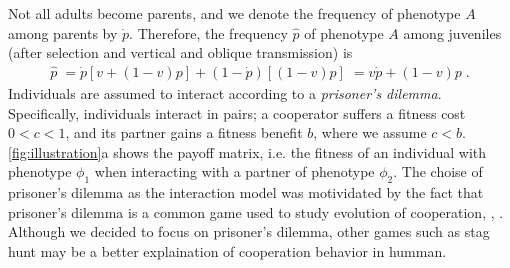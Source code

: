 \documentclass[12pt]{extarticle}
\begin{document}
Not all adults become parents, and we denote the frequency of phenotype $A$ among parents by $\dot{p}$.
Therefore, the frequency $\hat{p}$ of  phenotype $A$ among juveniles (after selection and vertical and oblique transmission) is
\begin{equation}\label{eq:horizontal}
\begin{aligned}
\hat{p} \;=
\dot{p} [v + (1-v)p] + (1-\dot{p}) [(1-v)p] \;= 
v \dot{p} + (1-v) p \;.
\end{aligned}
\end{equation}
Individuals are assumed to interact according to a \emph{prisoner's dilemma}.
Specifically, individuals interact in pairs; a cooperator suffers a fitness cost $0<c<1$, and its partner gains a fitness benefit $b$, where we assume $c<b$. \autoref{fig:illustration}a shows the payoff matrix, i.e. the fitness of an individual with phenotype $\phi_1$ when interacting with a partner of phenotype $\phi_2$.
The choise of prisoner's dilemma as the interaction model was motividated by the fact that prisoner's dilemma is a common game used to study evolution of cooperation\citep{axelrod1981evolution}, \citep{milinski1987tit}, \citep{nowak1992tit}.
Although we decided to focus on prisoner's dilemma, other games such as stag hunt\citep{skyrms2004stag} may be a better explaination of cooperation behavior in humman\citep{tomasello2012two}.
\end{document}
